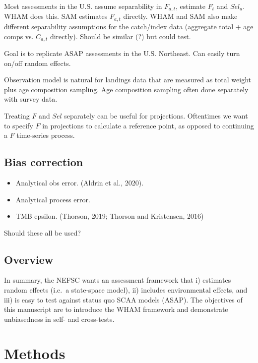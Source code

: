 \documentclass[]{article}
\providecommand{\tightlist}{%
  \setlength{\itemsep}{0pt}\setlength{\parskip}{0pt}}
\begin{document}
Most assessments in the U.S. assume separability in \(F_{a,t}\),
estimate \(F_t\) and \(Sel_a\). WHAM does this. SAM estimates
\(F_{a,t}\) directly. WHAM and SAM also make different separability
assumptions for the catch/index data (aggregate total + age comps vs.
\(C_{a,t}\) directly). Should be similar (?) but could test.

Goal is to replicate ASAP assessments in the U.S. Northeast. Can easily
turn on/off random effects.

Observation model is natural for landings data that are measured as
total weight plus age composition sampling. Age composition sampling
often done separately with survey data.

Treating \(F\) and \(Sel\) separately can be useful for projections.
Oftentimes we want to specify \(F\) in projections to calculate a
reference point, as opposed to continuing a \(F\) time-series process.

\hypertarget{bias-correction}{%
\subsection{Bias correction}\label{bias-correction}}

\begin{itemize}
\tightlist
\item
  Analytical obs error. (Aldrin et al., 2020).
\item
  Analytical process error.
\item
  TMB epsilon. (Thorson, 2019; Thorson and Kristensen, 2016)
\end{itemize}

Should these all be used?

\hypertarget{overview}{%
\subsection{Overview}\label{overview}}

In summary, the NEFSC wants an assessment framework that i) estimates
random effects (i.e.~a state-space model), ii) includes environmental
effects, and iii) is easy to test against status quo SCAA models (ASAP).
The objectives of this manuscript are to introduce the WHAM framework
and demonstrate unbiasedness in self- and cross-tests.

\hypertarget{methods}{%
\section{Methods}\label{methods}}
\end{document}
